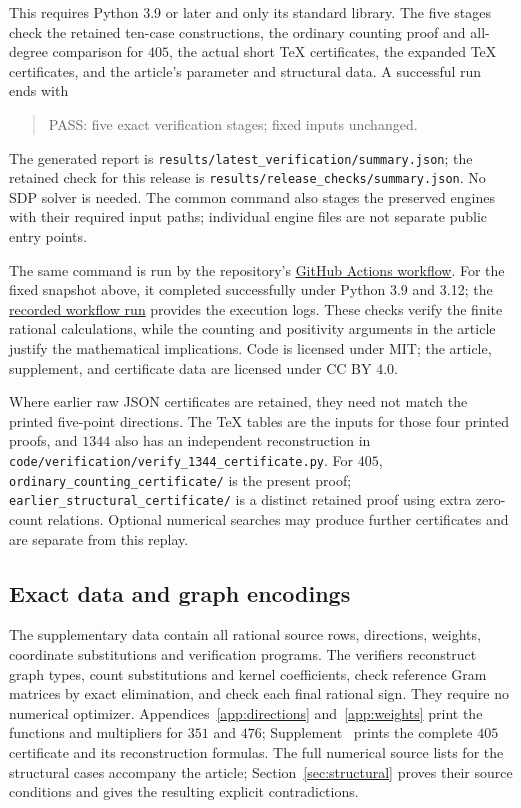 \documentclass[11pt]{article}
\theoremstyle{remark}
\numberwithin{equation}{section}
\begin{document}
\endgroup
This requires Python 3.9 or later and only its standard library.
The five stages check the retained ten-case constructions, the ordinary
counting proof and all-degree comparison for $405$, the actual short
TeX certificates, the expanded TeX certificates, and the article's
parameter and structural data. A successful run ends with
\begin{quote}\small\ttfamily
PASS: five exact verification stages; fixed inputs unchanged.
\end{quote}
The generated report is \nolinkurl{results/latest_verification/summary.json};
the retained check for this release is
\nolinkurl{results/release_checks/summary.json}. No SDP solver is needed.
The common command also stages the preserved engines with their required
input paths; individual engine files are not separate public entry points.

The same command is run by the repository's
\href{https://github.com/SelenaJXWANG/srg-gegenbauer-counting/actions}{GitHub Actions workflow}.
For the fixed snapshot above, it completed successfully under Python
3.9 and 3.12; the
\href{https://github.com/SelenaJXWANG/srg-gegenbauer-counting/actions/runs/38571633757}{recorded workflow run}
provides the execution logs. These checks verify the finite rational
calculations, while the counting and positivity arguments in the article
justify the mathematical implications. Code is licensed under MIT;
the article, supplement, and certificate data are licensed under CC BY 4.0.

Where earlier raw JSON certificates are retained, they need not match
the printed five-point directions. The TeX tables are
the inputs for those four printed proofs, and $1344$ also has an
independent reconstruction in
\nolinkurl{code/verification/verify_1344_certificate.py}.
For $405$, \nolinkurl{ordinary_counting_certificate/} is the present
proof; \nolinkurl{earlier_structural_certificate/} is a distinct retained
proof using extra zero-count relations. Optional numerical searches
may produce further certificates and are separate from this replay.

\subsection{Exact data and graph encodings}
The supplementary data contain all rational source rows, directions,
weights, coordinate substitutions and verification programs. The
verifiers reconstruct graph types, count substitutions and kernel
coefficients, check reference Gram matrices by exact elimination, and
check each final rational sign. They require no numerical optimizer.
Appendices~\ref{app:directions} and~\ref{app:weights} print the functions
and multipliers for $351$ and $476$; Supplement~\cite{supp405}
prints the complete $405$ certificate and its reconstruction formulas.
The full numerical source lists for the structural cases accompany the
article; Section~\ref{sec:structural} proves their source conditions and
gives the resulting explicit contradictions.
\end{document}
